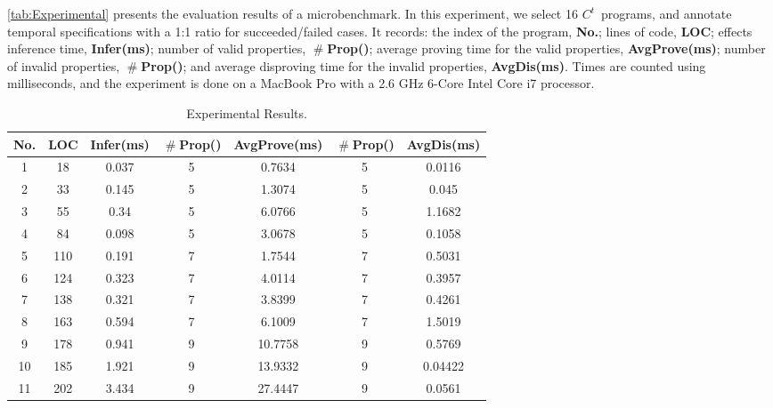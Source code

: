 \documentclass[acmsmall,10pt,review]{acmart}
\newcommand{\cmark}{\ding{51}}%
\newcommand{\xmark}{\ding{55}}%
\newcommand{\code}[1]{{\tt{\ensuremath{\m{#1}}}}}
\newcommand{\m}{\mathit}
\newcommand{\mysharp}{{\mathrel{\texttt{\#}}}}
\newcommand{\timedL}{\code{C^{t}}}
\begin{document}
{\autoref{tab:Experimental} presents the evaluation results of a microbenchmark. %
In this experiment, we select 16 \timedL\ programs, and  annotate temporal specifications
with a 1:1 ratio for succeeded/failed cases. 
It records: 
the index of the program, \textbf{No.};
lines of code, \textbf{LOC}; 
effects inference time, \textbf{Infer(ms)}; 
number of valid properties, \textbf{$\mysharp$Prop(\cmark)}; 
average proving time for the valid properties, \textbf{Avg\text{-}Prove(ms)};
number of invalid properties, \textbf{$\mysharp$Prop(\xmark)}; and 
average disproving time for the invalid properties, \textbf{Avg\text{-}Dis(ms)}. 
Times are counted using milliseconds, and the experiment is done on 
a MacBook Pro with a 2.6 GHz 6-Core Intel Core i7 processor. 

\begin{table}[!ht]
\caption{\label{tab:Experimental} Experimental Results. }
\centering
\renewcommand{\arraystretch}{1}
\begin{tabular} {c|c|c|c|c |c|c}
\hline
\textbf{No.} & \textbf{LOC} & \textbf{Infer(ms)} & \textbf{$\mysharp$Prop(\cmark)}   
& \textbf{Avg\text{-}Prove(ms)} & \textbf{$\mysharp$Prop(\xmark)}   & \textbf{Avg\text{-}Dis(ms)} \\ \hline\hline
1    &    18    & 0.037&  5     &  0.7634    & 5   &   0.0116   \\ \hline
2    &    33    & 0.145&  5     &  1.3074    & 5   &   0.045    \\ \hline
3    &    55    & 0.34 &  5     &  6.0766    & 5   &   1.1682   \\ \hline
4    &    84    & 0.098&  5     &  3.0678    & 5   &   0.1058   \\ \hline
5    &    110   & 0.191&  7     &  1.7544    & 7   &   0.5031   \\ \hline
6    &    124   & 0.323&  7     &  4.0114    & 7   &   0.3957   \\ \hline
7    &    138   & 0.321&  7     &  3.8399    & 7   &   0.4261   \\ \hline
8    &    163   & 0.594&  7     &  6.1009    & 7   &   1.5019   \\ \hline
9    &    178   & 0.941&  9     &  10.7758   & 9   &   0.5769   \\ \hline
10   &    185   & 1.921&  9     &  13.9332   & 9   &   0.04422  \\ \hline
11   &    202   & 3.434&  9     &  27.4447   & 9   &   0.0561   \\ \hline

\end{tabular}
\end{table}}
\end{document}

